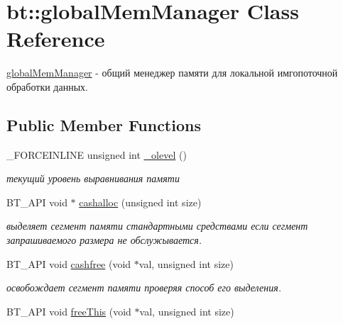 \hypertarget{classbt_1_1global_mem_manager}{\section{bt\-:\-:global\-Mem\-Manager Class Reference}
\label{classbt_1_1global_mem_manager}
}


\hyperlink{classbt_1_1global_mem_manager}{global\-Mem\-Manager} -\/ общий менеджер памяти для локальной имгопоточной обработки данных.  


\subsection*{Public Member Functions}
\begin{DoxyCompactItemize}
\item 
\hypertarget{classbt_1_1global_mem_manager_a2d6b5033c8ceeef3ee066eb93afd0a88}{\-\_\-\-F\-O\-R\-C\-E\-I\-N\-L\-I\-N\-E unsigned int \hyperlink{classbt_1_1global_mem_manager_a2d6b5033c8ceeef3ee066eb93afd0a88}{\-\_\-olevel} ()}\label{classbt_1_1global_mem_manager_a2d6b5033c8ceeef3ee066eb93afd0a88}

\begin{DoxyCompactList}\small\item\em текущий уровень выравнивания памяти \end{DoxyCompactList}\item 
\hypertarget{classbt_1_1global_mem_manager_a19b71f34300486aa91ff77e8e6052728}{B\-T\-\_\-\-A\-P\-I void $\ast$ \hyperlink{classbt_1_1global_mem_manager_a19b71f34300486aa91ff77e8e6052728}{cashalloc} (unsigned int size)}\label{classbt_1_1global_mem_manager_a19b71f34300486aa91ff77e8e6052728}

\begin{DoxyCompactList}\small\item\em выделяет сегмент памяти стандартными средствами если сегмент запрашиваемого размера не обслужывается. \end{DoxyCompactList}\item 
\hypertarget{classbt_1_1global_mem_manager_ac2228912da3c31550de64e5041b08d6a}{B\-T\-\_\-\-A\-P\-I void \hyperlink{classbt_1_1global_mem_manager_ac2228912da3c31550de64e5041b08d6a}{cashfree} (void $\ast$val, unsigned int size)}\label{classbt_1_1global_mem_manager_ac2228912da3c31550de64e5041b08d6a}

\begin{DoxyCompactList}\small\item\em освобождает сегмент памяти проверяя способ его выделения. \end{DoxyCompactList}\item 
\hypertarget{classbt_1_1global_mem_manager_af0177c70e18a7d037e3ba267228549f4}{B\-T\-\_\-\-A\-P\-I void \hyperlink{classbt_1_1global_mem_manager_af0177c70e18a7d037e3ba267228549f4}{free\-This} (void $\ast$val, unsigned int size)}\label{classbt_1_1global_mem_manager_af0177c70e18a7d037e3ba267228549f4}


\end{DoxyCompactItemize}
